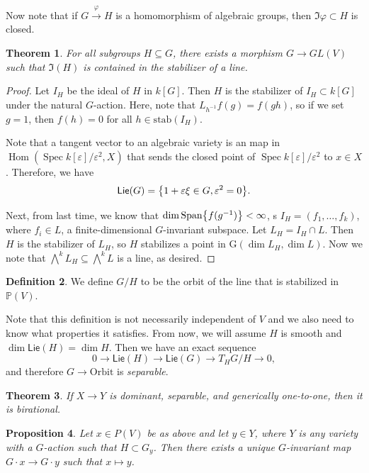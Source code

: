 \documentclass[leqno, openany]{memoir}
\newtheorem{thm}{Theorem}[section]
\newtheorem{prop}[thm]{Proposition}
\theoremstyle{definition}
\newtheorem{defn}[thm]{Definition}
\theoremstyle{remark}
\theoremstyle{plain}
\theoremstyle{definition}
\theoremstyle{remark}
\renewcommand{\P}{\mathbb{P}}
\newcommand{\ep}{\varepsilon}
\newcommand{\mr}[1]{\mathrm{#1}}
\newcommand{\ms}[1]{\mathsf{#1}}
\DeclareMathOperator{\Hom}{Hom}
\DeclareMathOperator{\Spec}{Spec}
\begin{document}
Now note that if $G \xrightarrow{\varphi} H$ is a homomorphism of algebraic groups, then $\Im \varphi \subset H$ is closed.

\begin{thm}
    For all subgroups $H \subseteq G$, there exists a morphism $G \to GL(V)$ such that $\Im(H)$ is contained in the stabilizer of a line. 
\end{thm}

\begin{proof}
Let $I_H$ be the ideal of $H$ in $k[G]$. Then $H$ is the stabilizer of $I_H \subset k[G]$ under the natural $G$-action. Here, note that $L_{h^{-1}} f(g) = f(gh)$, so if we set $g = 1$, then $f(h) = 0$ for all $h \in \mr{stab}(I_H)$.

Note that a tangent vector to an algebraic variety is an map in $\Hom(\Spec k[\ep]/\ep^2, X)$ that sends the closed point of $\Spec k[\ep]/\ep^2$ to $x \in X$. Therefore, we have 
\[ \ms{Lie}(G) = \qty{1 + \ep \xi \in G, \ep^2 = 0}. \]

Next, from last time, we know that $\dim \mr{Span} \qty{f(g^{-1})} < \infty$, s $I_H = (f_1, \ldots, f_k)$, where $f_i \in L$, a finite-dimensional $G$-invariant subspace. Let $L_H = I_H \cap L$. Then $H$ is the stabilizer of $L_H$, so $H$ stabilizes a point in $\mr{G}(\dim L_H, \dim L)$. Now we note that $\bigwedge^k L_H \subseteq \bigwedge^k L$ is a line, as desired.
\end{proof}

\begin{defn}
    We define $G/H$ to be the orbit of the line that is stabilized in $\P(V)$.
\end{defn}

Note that this definition is not necessarily independent of $V$ and we also need to know what properties it satisfies. From now, we will assume $H$ is smooth and $\dim \ms{Lie}(H) = \dim H$. Then we have an exact sequence
\[ 0 \to \ms{Lie}(H) \to \ms{Lie}(G) \to T_H G/H \to 0, \]
and therefore $G \to \mr{Orbit}$ is \textit{separable}. 

\begin{thm}
    If $X \to Y$ is dominant, separable, and generically one-to-one, then it is birational.
\end{thm}

\begin{prop}
Let $x \in P(V)$ be as above and let $y \in Y$, where $Y$ is any variety with a $G$-action such that $H \subset G_y$. Then there exists a unique $G$-invariant map $G \cdot x \to G \cdot y$ such that $x \mapsto y$.
\end{prop}
\end{document}
